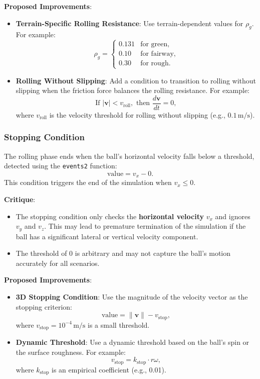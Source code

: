 \documentclass[10pt,a4paper]{report}
\begin{document}
\textbf{Proposed Improvements}:
\begin{itemize}
    \item \textbf{Terrain-Specific Rolling Resistance}: Use terrain-dependent values for $\rho_g$. For example:
    \[
    \rho_g =
    \begin{cases}
    0.131 & \text{for green}, \\
    0.10 & \text{for fairway}, \\
    0.30 & \text{for rough}.
    \end{cases}
    \]
    \item \textbf{Rolling Without Slipping}: Add a condition to transition to rolling without 
    slipping when the friction force balances the rolling resistance. For example:
    \[
    \text{If } |\mathbf{v}| < v_{\text{roll}}, \text{ then } \frac{d\mathbf{v}}{dt} = 0,
    \]
    where $v_{\text{roll}}$ is the velocity threshold for rolling without slipping (e.g., $0.1 \, \text{m/s}$).
\end{itemize}


\subsubsection{Stopping Condition}
\label{subsubsec:stopping_condition}

The rolling phase ends when the ball's horizontal velocity falls below a threshold, detected using 
the \texttt{events2} function:
\[
\text{value} = v_x - 0.
\]
This condition triggers the end of the simulation when $v_x \leq 0$.

\textbf{Critique}:
\begin{itemize}
    \item The stopping condition only checks the \textbf{horizontal velocity} $v_x$ and 
    ignores $v_y$ and $v_z$. This may lead to premature termination of the simulation if 
    the ball has a significant lateral or vertical velocity component.
    \item The threshold of $0$ is arbitrary and may not capture the ball's motion accurately for all scenarios.
\end{itemize}

\textbf{Proposed Improvements}:
\begin{itemize}
    \item \textbf{3D Stopping Condition}: Use the magnitude of the velocity vector as the stopping criterion:
    \[
    \text{value} = \|\mathbf{v}\| - v_{\text{stop}},
    \]
    where $v_{\text{stop}} = 10^{-4} \, \text{m/s}$ is a small threshold.
    \item \textbf{Dynamic Threshold}: Use a dynamic threshold based on the ball's spin or the 
    surface roughness. For example:
    \[
    v_{\text{stop}} = k_{\text{stop}} \cdot r \omega,
    \]
    where $k_{\text{stop}}$ is an empirical coefficient (e.g., 0.01).
\end{itemize}
\end{document}
